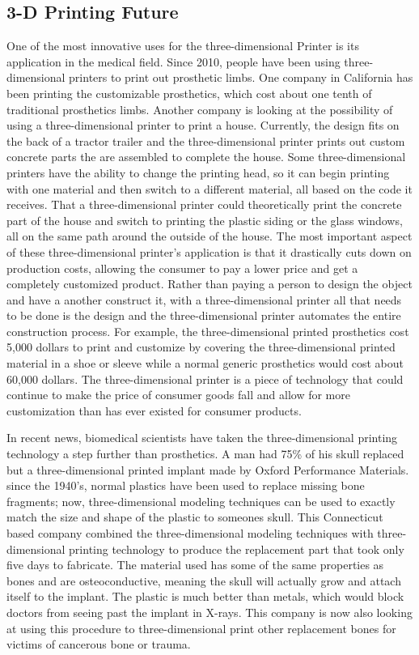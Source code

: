 \documentclass[pdftex,10.5pt]{report}
\begin{document}
\subsection{3-D Printing Future}
One of the most innovative uses for the three-dimensional Printer is its application in the medical field. Since 2010, people have been using three-dimensional printers to print out prosthetic limbs. One company in California has been printing the customizable prosthetics, which cost about one tenth of traditional prosthetics limbs. Another company is looking at the possibility of using a three-dimensional printer to print a house. Currently, the design fits on the back of a tractor trailer and the three-dimensional printer prints out custom concrete parts the are assembled to complete the house. Some three-dimensional printers have the ability to change the printing head, so it can begin printing with one material and then switch to a different material, all based on the code it receives. That a three-dimensional printer could theoretically print the concrete part of the house and switch to printing the plastic siding or the glass windows, all on the same path around the outside of the house. The most important aspect of these three-dimensional printer's application is that it drastically cuts down on production costs, allowing the consumer to pay a lower price and get a completely customized product. Rather than paying a person to design the object and have a another construct it, with a three-dimensional printer all that needs to be done is the design and the three-dimensional printer automates the entire construction process. For example, the three-dimensional printed prosthetics cost 5,000 dollars to print and customize by covering the three-dimensional printed material in a shoe or sleeve while a normal generic prosthetics would cost about 60,000 dollars.\cite{cite5} The three-dimensional printer is a piece of technology that could continue to make the price of consumer goods fall and allow for more customization than has ever existed for consumer products.

In recent news, biomedical scientists have taken the three-dimensional printing technology a step further than prosthetics. A man had 75\% of his skull replaced but a three-dimensional printed implant made by Oxford Performance Materials. since the 1940's, normal plastics have been used  to replace missing bone fragments; now, three-dimensional modeling techniques can be used to exactly match the size and shape of the plastic to someones skull. This Connecticut based company combined the three-dimensional modeling techniques with three-dimensional printing technology to produce the replacement part that took only five days to fabricate.\cite{cite9} The material used has some of the same properties as bones and are osteoconductive, meaning the skull will actually grow and attach itself to the implant. The plastic is much better than metals, which would block doctors from seeing past the implant in X-rays. This company is now also looking at using this procedure to three-dimensional print other replacement bones for victims of cancerous bone or trauma.
\end{document}
